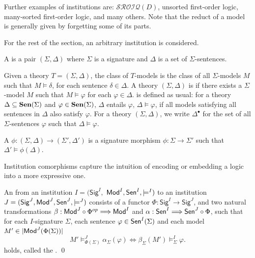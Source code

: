 \documentclass[10pt,fleqn,final]{scrreprt}
\newcommand{\Sig}{\mathsf{Sig}}
\newenvironment{definitions}[0]{\medskip }{}
\begin{document}
\begin{definitions}
Further examples of institutions are: $\mathcal{SROIQ}(D)$, unsorted first-order logic, 
many-sorted first-order logic, and many others.  Note that the reduct of a model 
is generally given by forgetting some of its parts.

For the rest of the section, an arbitrary institution is considered. 

\begin{definition}[Theory]
A  is a pair $(\Sigma,\Delta)$ where $\Sigma$ is a signature and $\Delta$ is a set of $\Sigma$-sentences.
\end{definition}


Given a theory $T=(\Sigma, \Delta)$, the class of $T$-models is the class of all
$\Sigma$-models $M$ such that $M\models \delta$, for each sentence $\delta \in \Delta$.
A theory $(\Sigma, \Delta)$ is  if there exists a $\Sigma$-model $M$ such that
$M\models\varphi$ for each $\varphi \in \Delta$.  is defined as usual: 
for  a theory $\Delta\subseteq \mathbf {Sen}(\Sigma)$ and 
$\varphi\in \mathbf {Sen}(\Sigma)$, $\Delta$ entails $\varphi$, $\Delta\models\varphi$, if all models satisfying all sentences in
$\Delta$ also satisfy $\varphi$. For a theory $(\Sigma, \Delta)$, we write $\Delta^\bullet$ for the set of all $\Sigma$-sentences $\varphi$ such that $\Delta \models \varphi$. 

\begin{definition}
A  $\phi: (\Sigma, \Delta) \rightarrow (\Sigma',  \Delta')$ is 
   a signature morphism $\phi:\Sigma\rightarrow \Sigma'$ such that $\Delta'\models \phi(\Delta)$.
\end{definition}
\medskip

Institution comorphisms capture the intuition of encoding or embedding a logic into a more expressive one.

\begin{definition} An  from an institution $I = (\Sig^I,$ $ \mathsf{Mod}^I, \mathsf{Sen}^I, \models^I)$ to an institution $J=(\Sig^J, \Mod^J,\Sen^J, \models^J)$ consists of a functor $\Phi : \Sig^I \longrightarrow \Sig^J$, and
two natural transformations $\beta: \mathsf{Mod}^J \circ \Phi^{op} \Longrightarrow \mathsf{Mod}^I$
and $\alpha: \mathsf{Sen}^I \Longrightarrow \mathsf{Sen}^J \circ \Phi$, such that 
for each $I$-signature $\Sigma$, each sentence $\varphi\in\mathsf{Sen}^I(\Sigma)$ and each model $M'\in|\mathsf{Mod}^J(\Phi(\Sigma))|$
$$ M'\models^{J}_{\Phi(\Sigma)}\alpha_{\Sigma}(\varphi) \Leftrightarrow
\beta_{\Sigma}(M')\models^I_{\Sigma}\varphi.
$$
holds, called the .
\qed\end{definition}


\end{definitions}
\end{document}
